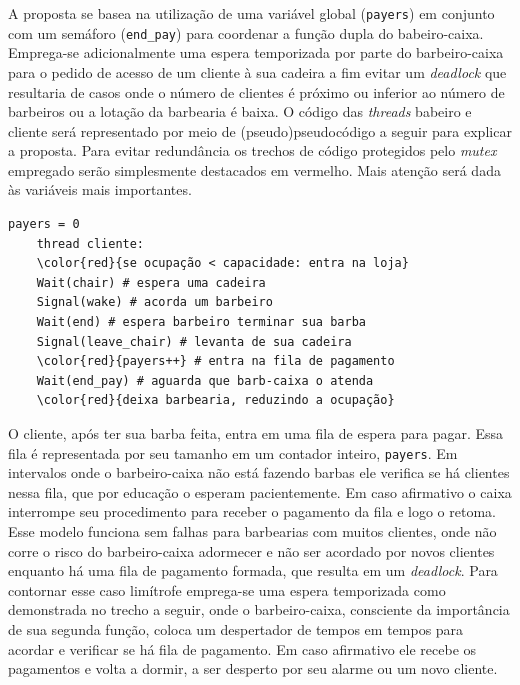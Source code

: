 \documentclass{article}
\begin{document}
A proposta se basea na utilização de uma variável global (\verb+payers+) em conjunto com um semáforo (\verb+end_pay+) para coordenar a função dupla do babeiro-caixa. Emprega-se adicionalmente uma espera temporizada por parte do barbeiro-caixa para o pedido de acesso de um cliente à sua cadeira a fim evitar um \textit{deadlock} que resultaria de casos onde o número de clientes é próximo ou inferior ao número de barbeiros ou a lotação da barbearia é baixa. O código das \textit{threads} babeiro e
cliente será representado por meio de (pseudo)pseudocódigo a seguir para explicar a proposta. Para evitar redundância os trechos de código protegidos pelo \textit{mutex} empregado serão simplesmente destacados em vermelho. Mais atenção será dada às variáveis mais importantes.

\begin{Verbatim}[commandchars=\\\{\}]
    payers = 0 
    thread cliente:
    \color{red}{se ocupação < capacidade: entra na loja}
    Wait(chair) # espera uma cadeira
    Signal(wake) # acorda um barbeiro
    Wait(end) # espera barbeiro terminar sua barba
    Signal(leave_chair) # levanta de sua cadeira
    \color{red}{payers++} # entra na fila de pagamento
    Wait(end_pay) # aguarda que barb-caixa o atenda
    \color{red}{deixa barbearia, reduzindo a ocupação}
\end{Verbatim}

O cliente, após ter sua barba feita, entra em uma fila de espera para pagar. Essa fila é representada por seu tamanho em um contador inteiro, \verb+payers+. Em intervalos onde o barbeiro-caixa não está fazendo barbas ele verifica se há clientes nessa fila, que por educação o esperam pacientemente. Em caso afirmativo o caixa interrompe seu procedimento para receber o pagamento da fila e logo o retoma. Esse modelo funciona sem falhas para barbearias com muitos clientes, onde não corre o risco do barbeiro-caixa adormecer e não ser acordado por novos clientes enquanto há uma fila de pagamento formada, que resulta em um \textit{deadlock}. Para contornar esse caso limítrofe emprega-se uma espera temporizada como demonstrada no trecho a seguir, onde o barbeiro-caixa, consciente da importância de sua segunda função, coloca um despertador de tempos em tempos para acordar e verificar se há fila de pagamento. Em caso afirmativo ele recebe os pagamentos e volta a dormir, a ser desperto por seu alarme ou um novo cliente.
\end{document}
